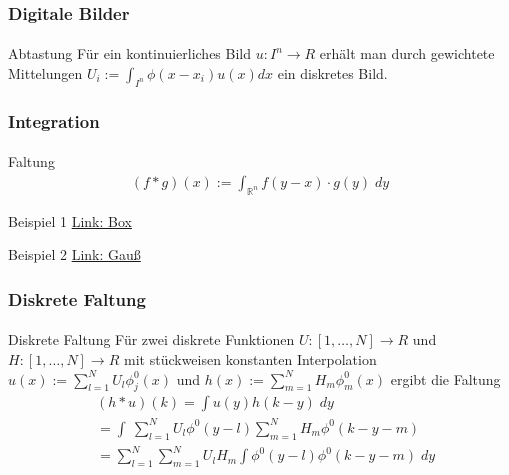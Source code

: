 \documentclass{beamer}
\begin{document}
\begin{frame}
    \frametitle{Digitale Bilder}
\framesubtitle{}
\begin{block}{Abtastung}
Für ein kontinuierliches  Bild $u : I^n \to R$ erhält man durch gewichtete Mittelungen
$U_i := \int_{I^n} \phi (x - x_i) u(x) dx$ ein diskretes Bild. 
\end{block}
 \end{frame}


\begin{frame}
    \frametitle{Integration}
\framesubtitle{}

    \begin{block}{Faltung}
\begin{align}
(f * g )(x) := \int_{\mathbb{R}^n}  f(y-x) \cdot g(y) \; dy 
\end{align}

\end{block}
    \begin{block}{Beispiel 1}
\href{https://moodle.dhbw-mannheim.de/pluginfile.php/278535/mod_folder/content/0/Convolution_of_box_signal_with_itself.gif?forcedownload=1}{Link: Box}
\end{block}
 
    \begin{block}{Beispiel 2}
\href{https://moodle.dhbw-mannheim.de/pluginfile.php/278535/mod_folder/content/0/Convolution_Animation_(Gaussian).gif?forcedownload=1}{Link: Gauß}
\end{block}
 
\end{frame}


\begin{frame}
    \frametitle{Diskrete Faltung}
\framesubtitle{}

    \begin{block}{Diskrete Faltung}
Für zwei diskrete  Funktionen $U : [1, \ldots, N]  \to R$ und $H : [1, \ldots, N]  \to R$ mit stückweisen konstanten Interpolation $u(x) := \sum_{l=1}^{N} U_l \phi^0_j(x)$ und 
$h(x) := \sum_{m=1}^{N} H_m \phi^0_m(x)$ ergibt die Faltung 
\begin{align*}
& (h * u)(k) = \int u(y)h(k-y)  \; dy \\
& = \int \ \sum_{l=1}^{N} U_l \phi^0(y-l) \sum_{m=1}^{N} H_m \phi^0(k-y-m) \\
& = \sum_{l=1}^{N}   \sum_{m=1}^{N} U_l  H_m  \int  \phi^0(y-l) \phi^0(k-y-m) \; dy 
\end{align*}

\end{block}
 \end{frame}
\end{document}
